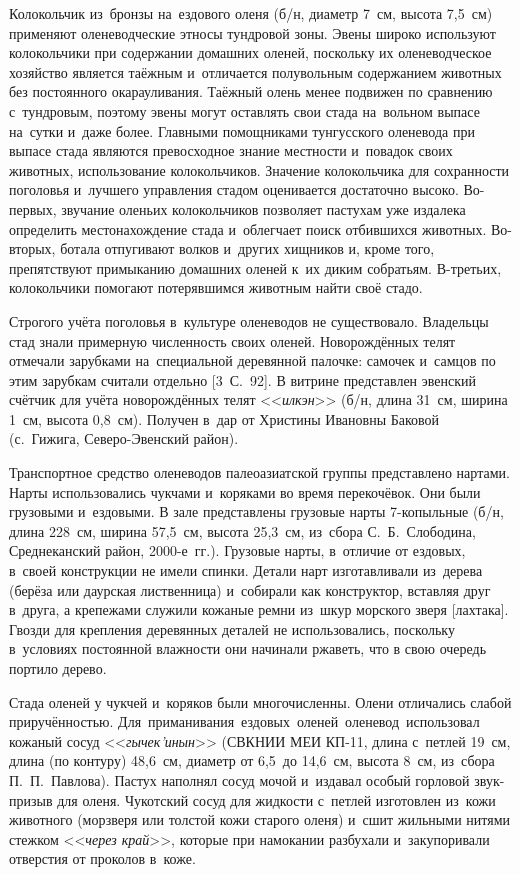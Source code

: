 Колокольчик из~бронзы на~ездового оленя (б/н, диаметр 7~см, высота 7,5~см) применяют оленеводческие этносы тундровой зоны. Эвены широко используют колокольчики при содержании домашних оленей, поскольку их оленеводческое хозяйство является таёжным и~отличается полувольным содержанием животных без постоянного окарауливания. Таёжный олень менее подвижен по сравнению с~тундровым, поэтому эвены могут оставлять свои стада на~вольном выпасе на~сутки и~даже более. Главными помощниками тунгусского оленевода при выпасе стада являются превосходное знание местности и~повадок своих животных, использование колокольчиков. Значение колокольчика для сохранности поголовья и~лучшего управления стадом оценивается достаточно высоко. Во-первых, звучание оленьих колокольчиков позволяет пастухам уже издалека определить местонахождение стада и~облегчает поиск отбившихся животных. Во-вторых, ботала отпугивают волков и~других хищников и, кроме того, препятствуют примыканию домашних оленей к~их диким собратьям. В-третьих, колокольчики помогают потерявшимся животным найти своё стадо.

Строгого учёта поголовья в~культуре оленеводов не существовало. Владельцы стад знали примерную численность своих оленей. Новорождённых телят отмечали зарубками на~специальной деревянной палочке: самочек и~самцов по этим зарубкам считали отдельно [3~С.~92]. В витрине представлен эвенский счётчик для учёта новорождённых телят <<\textit{илкэн}>> (б/н, длина 31~см, ширина 1~см, высота 0,8~см). Получен в~дар от Христины Ивановны Баковой (с.~Гижига, Северо-Эвенский район).

Транспортное средство оленеводов палеоазиатской группы представлено нартами. Нарты использовались чукчами и~коряками во время перекочёвок. Они были грузовыми и~ездовыми. В зале представлены грузовые нарты 7-копыльные (б/н, длина 228~см, ширина 57,5~см, высота 25,3~см, из~сбора С.~Б.~Слободина, Среднеканский район, 2000-е~гг.). Грузовые нарты, в~отличие от ездовых, в~своей конструкции не имели спинки. Детали нарт изготавливали из~дерева (берёза или даурская лиственница) и~собирали как конструктор, вставляя друг в~друга, а крепежами служили кожаные ремни из~шкур морского зверя [лахтака]. Гвозди для крепления деревянных деталей не использовались, поскольку в~условиях постоянной влажности они начинали ржаветь, что в свою очередь портило дерево.

Стада оленей у чукчей и~коряков были многочисленны. Олени отличались слабой приручённостью. Для\,\,\,приманивания\,\,\,ездовых\,\,\,оленей\,\,\,оленевод\,\,\,использовал кожаный сосуд <<\textit{гычек'инын}>> (СВКНИИ МЕИ КП-11, длина с~петлей 19~см, длина (по контуру) 48,6~см, диаметр от 6,5~до 14,6~см, высота 8~см, из~сбора П.~П.~Павлова). Пастух наполнял сосуд мочой и~издавал особый горловой звук-призыв для оленя. Чукотский сосуд для жидкости с~петлей изготовлен из~кожи животного (морзверя или толстой кожи старого оленя) и~сшит жильными нитями стежком <<\textit{через край}>>, которые при намокании разбухали и~закупоривали отверстия от проколов в~коже.

